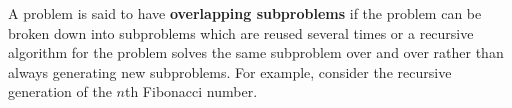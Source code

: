 \documentclass{article}
\begin{document}
    
        
        
        
        
        
        
    
    A problem is said to have \textbf{overlapping subproblems} if the problem can be broken down into subproblems which are reused several times or a recursive algorithm for the problem solves the same subproblem over and over rather than always generating new subproblems. For example, consider the recursive generation of the $n$th Fibonacci number.
    
\end{document}
